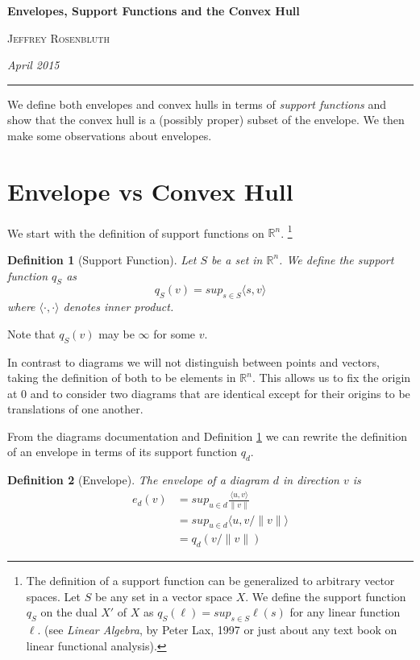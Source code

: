 \documentclass[11pt]{amsart}
\newtheorem{defn}{Definition}
\begin{document}
\begin{center}
\bigskip 
\textbf{Envelopes, Support Functions and the Convex Hull}

\textsc{Jeffrey Rosenbluth}

\textit{April 2015}
\end{center}
\hrule
\vspace{0.25in}

We define both envelopes and convex hulls in terms of \emph{support functions} and show
that the convex hull is a (possibly proper) subset of the envelope. We then make some observations
about envelopes. 

\section{Envelope vs Convex Hull}

We start with the definition of support functions
on  $\mathbb{R}^n$.
\footnote{
The definition of a support function can be generalized to arbitrary vector spaces.
Let $S$ be any set in a vector space $X$. We define the support function $q_S$ on the dual $X'$ of $X$ as 
$q_S(\ell) = sup_{s \in S} \ell(s)$
for any linear function $\ell.$ 
(see \emph{Linear Algebra}, by Peter Lax, 1997 or just about any  text book on linear functional analysis).
}
\begin{defn}[Support Function]
\label{supportfunc}
Let $S$ be a set in $\mathbb{R}^n$. We define the support function $q_S$ as 
$$q_S(v) = sup_{s \in S} \langle s,v \rangle$$
where $\langle \cdot, \cdot \rangle$ denotes inner product.
\end{defn}

Note that $q_S(v)$ may be $\infty$ for some $v$. 

In contrast to diagrams we will not distinguish between points and vectors, taking the definition of both to be elements in $\mathbb{R}^n$.
This allows us to fix the origin at $0$ and to consider two diagrams that are identical except for their origins to be translations of one another.

From the diagrams documentation and Definition \ref{supportfunc} we can rewrite the definition of an envelope 
in terms of its support function $q_d$.
\begin{defn}[Envelope]
The envelope of a diagram $d$ in direction $v$ is
\begin{align}
e_d(v) &= sup_{u \in d} \frac{\langle u, v \rangle}{\|v\|}\\
           &=sup_{u \in d} \langle u, v/\|v\| \rangle\\
           &=q_d(v/\|v\|)
\end{align}
\end{defn}
\end{document}
